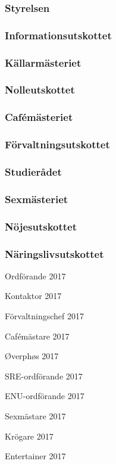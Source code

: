 \documentclass[../_main/handlingar.tex]{subfiles}
\begin{document}

\subsubsection*{Styrelsen}

\subsubsection*{Informationsutskottet}

\subsubsection*{Källarmästeriet}

\subsubsection*{Nolleutskottet}

\subsubsection*{Cafémästeriet}

\subsubsection*{Förvaltningsutskottet}

\subsubsection*{Studierådet}

\subsubsection*{Sexmästeriet}

\subsubsection*{Nöjesutskottet}

\subsubsection*{Näringslivsutskottet}
\newpage
\begin{signatures}{10}
    \mvh
    \signature{Erik Månsson}{Ordförande 2017}
    \signature{Johan Karlberg}{Kontaktor 2017}
    \signature{Sophia Grimmeiss Grahm}{Förvaltningschef 2017}
    \signature{Daniel Bakic}{Cafémästare 2017}
    \signature{Niklas Gustafson}{Øverphøs 2017}
    \signature{Pontus Landgren}{SRE-ordförande 2017}
    \signature{Josefine Sandström}{ENU-ordförande 2017}
    \signature{Linnea Sjödahl}{Sexmästare 2017}
    \signature{Markus Rahne}{Krögare 2017}
    \signature{Albin Nyström Eklund}{Entertainer 2017}
\end{signatures}
\end{document}
